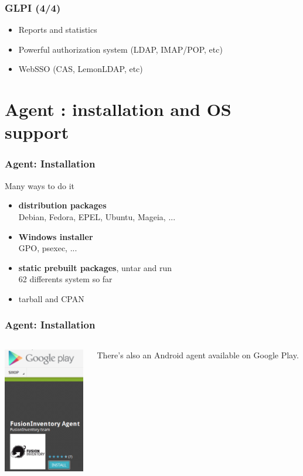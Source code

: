 \documentclass{beamer}
\begin{document}
\begin{frame}
    \frametitle{GLPI (4/4)}

    \begin{itemize}
    \item Reports and statistics
    \item Powerful authorization system (LDAP, IMAP/POP, etc)
    \item WebSSO (CAS, LemonLDAP, etc)
    \end{itemize}
\end{frame}

\section{Agent : installation and OS support}

\begin{frame}
    \frametitle{Agent: Installation}


    \begin{block}{Many ways to do it}
        \begin{itemize}
            \item \textbf{distribution packages} \\
            \small{Debian, Fedora, EPEL, Ubuntu, Mageia, ...}
            \item \textbf{Windows installer} \\
            \small{GPO, psexec, ...}
            \item \textbf{static prebuilt packages}, untar and run \\
            \small{62 differents system so far}
            \item tarball and CPAN
        \end{itemize}
    \end{block}
\end{frame}

\begin{frame}
    \frametitle{Agent: Installation}

   \begin{columns}
   \begin{column}{0.35\textwidth}
\includegraphics[height=5.5cm]{pics/googleplay.png}
 \end{column}
 \begin{column}{0.65\textwidth}
There's also an Android agent available on Google Play.
 \end{column}
\end{columns}

\end{frame}
\end{document}
